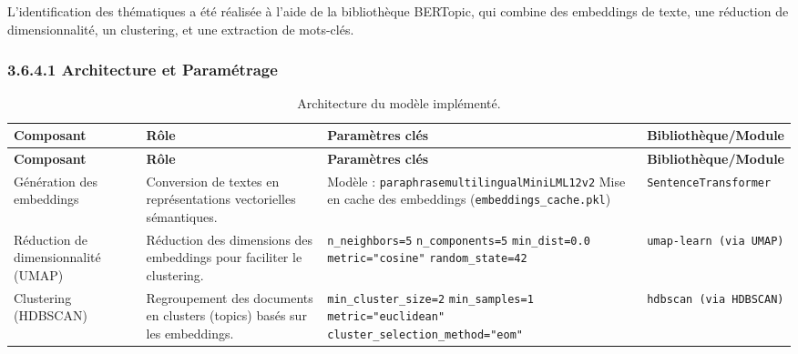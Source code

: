 \documentclass[mstat,12pt]{unswthesis}
\begin{document}
L'identification des thématiques a été réalisée à l'aide de la bibliothèque BERTopic, qui combine des embeddings de texte, une réduction de dimensionnalité, un clustering, et une 
extraction de mots-clés.

\bigskip

\subsubsection{3.6.4.1   Architecture et Paramétrage}

\bigskip

\begin{scriptsize}
\begin{longtable}{@{}p{3.7cm} p{3.9cm} p{5.5cm} p{3.8cm}@{}}
\caption{Architecture du modèle implémenté.\label{tab:modele}} \\
\toprule
\textbf{Composant} & \textbf{Rôle} & \textbf{Paramètres clés} & \textbf{Bibliothèque/Module} \\
\midrule
\endfirsthead

\toprule
\textbf{Composant} & \textbf{Rôle} & \textbf{Paramètres clés} & \textbf{Bibliothèque/Module} \\
\midrule
\endhead

\midrule
\endfoot

\bottomrule
\endlastfoot

Génération des embeddings & Conversion de textes en représentations vectorielles sémantiques. & 
Modèle : \texttt{paraphrase\-multilingual\-MiniLM\-L12\-v2} \newline
Mise en cache des embeddings (\texttt{embeddings\_cache.pkl}) &
\texttt{SentenceTransformer} \\

Réduction de dimensionnalité (UMAP) & Réduction des dimensions des embeddings pour faciliter le clustering. &
\texttt{n\_neighbors=5} \newline
\texttt{n\_components=5} \newline
\texttt{min\_dist=0.0} \newline
\texttt{metric="cosine"} \newline
\texttt{random\_state=42} & 
\texttt{umap-learn (via UMAP)} \\

Clustering (HDBSCAN) & Regroupement des documents en clusters (topics) basés sur les embeddings. &
\texttt{min\_cluster\_size=2} \newline
\texttt{min\_samples=1} \newline
\texttt{metric="euclidean"} \newline
\texttt{cluster\_selection\_method="eom"} & 
\texttt{hdbscan (via HDBSCAN)} \\


\end{longtable}
\end{scriptsize}
\end{document}

